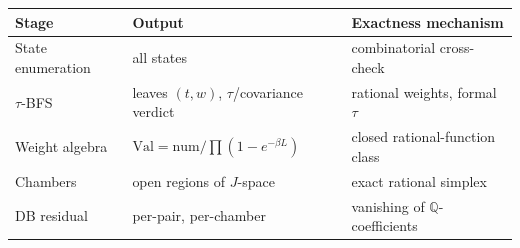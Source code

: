 \documentclass[10pt]{article}
\newcommand{\Q}{\mathbb{Q}}
\begin{document}
\begin{center}\small
\begin{tabular}{@{}lll@{}}
\toprule
Stage & Output & Exactness mechanism\\
\midrule
State enumeration & all states & combinatorial cross-check\\
$\tau$-BFS & leaves $(t,w)$, $\tau$/covariance verdict & rational weights, formal $\tau$\\
Weight algebra & $\mathrm{Val}=\text{num}/\prod(1-e^{-\beta L})$ & closed rational-function class\\
Chambers & open regions of $J$-space & exact rational simplex\\
DB residual & per-pair, per-chamber & vanishing of $\Q$-coefficients\\
\bottomrule
\end{tabular}
\end{center}
\end{document}
